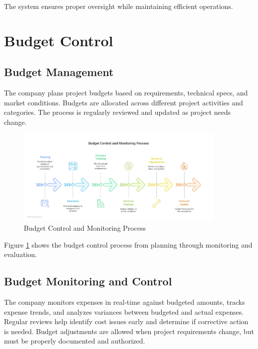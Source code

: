 The system ensures proper oversight while maintaining efficient operations.

\vspace{0.5em}
\section{Budget Control}

\subsection{Budget Management}
The company plans project budgets based on requirements, technical specs, and market conditions. Budgets are allocated across different project activities and categories. The process is regularly reviewed and updated as project needs change.

\begin{figure}[H]
    \centering
    \includegraphics[width=0.9\textwidth]{assets/images/budget_control.png}
    \caption{Budget Control and Monitoring Process}
    \label{fig:budget_control}
\end{figure}

Figure \ref{fig:budget_control} shows the budget control process from planning through monitoring and evaluation.

\subsection{Budget Monitoring and Control}
The company monitors expenses in real-time against budgeted amounts, tracks expense trends, and analyzes variances between budgeted and actual expenses. Regular reviews help identify cost issues early and determine if corrective action is needed. Budget adjustments are allowed when project requirements change, but must be properly documented and authorized.
